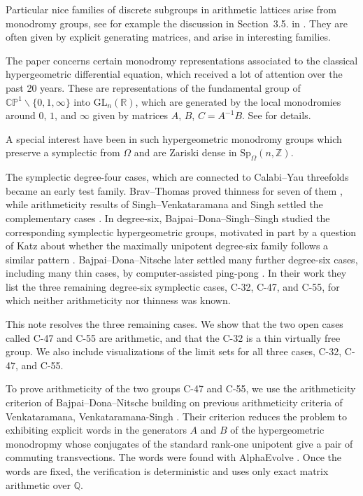 \documentclass[11pt]{article}
\newcommand{\QQ}{\mathbb{Q}}
\begin{document}
Particular nice families of discrete subgroups in arithmetic lattices arise from monodromy groups, see for example the discussion in Section~3.5. in \cite{Sarnak2014NotesThin}. 
They are often given by explicit generating matrices, and arise in interesting families. 

The paper concerns certain monodromy representations associated to the classical hypergeometric differential equation, which received a lot of attention over the past 20 years.
These are representations of the fundamental group of $\mathbb{C}\mathbb{P}^1 \backslash \{ 0, 1, \infty\}$ into $\mathrm{GL}_n(\mathbb{R})$, which are generated by the local monodromies around $0$, $1$, and $\infty$ given by matrices $A$, $B$, $C = A^{-1}B$. 
See 
\cite{Levelt1961HypergeometricFunctions,BeukersHeckman1989hypergeometric} for details. 

A special interest have been in such hypergeometric monodromy groups which preserve a symplectic from $\Omega$ and are Zariski dense in $\mathrm{Sp}_{\Omega}(n,\mathbb{Z})$.

The symplectic degree-four cases, which are connected to Calabi--Yau threefolds became an early test family.  
Brav--Thomas proved thinness for seven of them \cite{BravThomas2014Thin}, while arithmeticity results of Singh--Venkataramana and Singh settled the complementary cases \cite{SinghVenkataramana2014Arithmeticity,Singh2015Four}.  
In degree-six, Bajpai--Dona--Singh--Singh studied the corresponding symplectic hypergeometric groups, motivated in part by a question of Katz about whether the maximally unipotent degree-six family follows a similar pattern \cite{BajpaiDonaSinghSingh2021degreesix}.  
Bajpai--Dona--Nitsche later settled many further degree-six cases, including many thin cases, by computer-assisted ping-pong \cite{BajpaiDonaNitsche2025Thin}.  
In their work \cite[Table 3]{BajpaiDonaNitsche2025Thin} they list the three remaining degree-six symplectic cases, C-32, C-47, and C-55, for which neither arithmeticity nor thinness was known.

This note resolves the three remaining cases. 
We show that the two open cases called C-47 and C-55 are arithmetic, and that the C-32 is a thin virtually free group.
We also include visualizations of the limit sets for all three cases, C-32, C-47, and C-55.

To prove arithmeticity of the two groups C-47 and C-55, we use the arithmeticity criterion of Bajpai--Dona--Nitsche \cite{BajpaiDonaNitsche2026Arithmetic} building on previous arithmeticity criteria of Venkataramana, Venkataramana-Singh \cite{Venkataramana1987Zariskidensesubgroups, SinghVenkataramana2014Arithmeticity,Singh2015Four}. 
Their criterion reduces the problem to  exhibiting explicit words in the  generators $A$ and $B$ of the hypergeometric monodropmy whose conjugates of the standard rank-one unipotent give a  pair of commuting transvections.  
The words were found with AlphaEvolve \cite{NovikovEtAl2025AlphaEvolve,georgiev2025mathematical}.  
Once the words are fixed, the verification is deterministic and uses only exact matrix arithmetic over $\QQ$.
\end{document}
